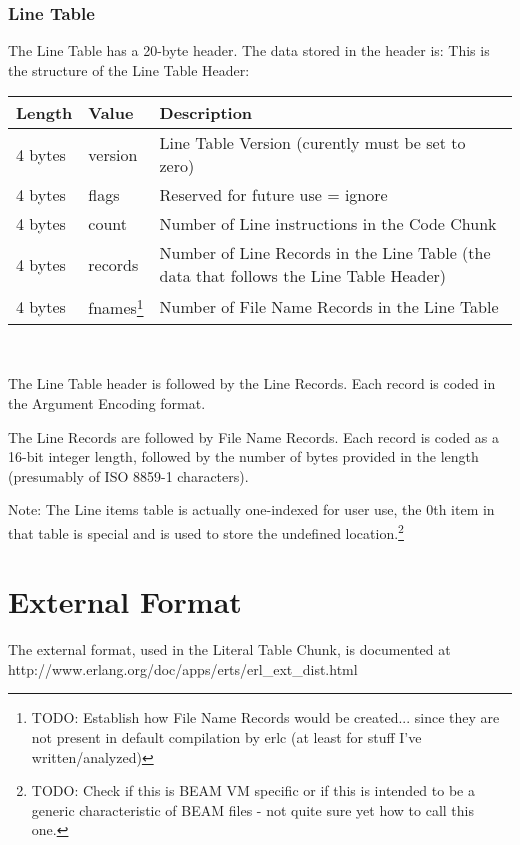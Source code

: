 \documentclass{article}
\begin{document}
\subsubsection{Line Table}
The Line Table has a 20-byte header.  The data stored in the header is:
This is the structure of the Line Table Header:\\
\begin{savenotes}
\begin{tabular}{ |l|l|p{3in}| } \hline
Length  & Value  & Description\\ \hline
4 bytes & version & Line Table Version (curently must be set to zero)\\ \hline
4 bytes & flags & Reserved for future use = ignore\\ \hline
4 bytes & count & Number of Line instructions in the Code Chunk\\ \hline
4 bytes & records & Number of Line Records in the Line Table (the data that follows the Line Table Header)\\ \hline
4 bytes & fnames\footnote{TODO: Establish how File Name Records would be created... since they are not present in default compilation by erlc (at least for stuff I've written/analyzed)} & Number of File Name Records in the Line Table\\ \hline
\end{tabular}\\
\end{savenotes}

The Line Table header is followed by the Line Records.  Each record is coded 
in the Argument Encoding format.

The Line Records are followed by File Name Records.  Each record is coded 
as a 16-bit integer length, followed by the number of bytes provided in the 
length (presumably of ISO 8859-1 characters).

Note: The Line items table is actually one-indexed for user use, the 0th
item in that table is special and is used to store the undefined
location.\footnote{TODO: Check if this is BEAM VM specific or if this is
intended to be a generic characteristic of BEAM files - not quite sure
yet how to call this one.}



\section{External Format}

The external format, used in the Literal Table Chunk, is documented at\\
http://www.erlang.org/doc/apps/erts/erl\_ext\_dist.html
\end{document}
